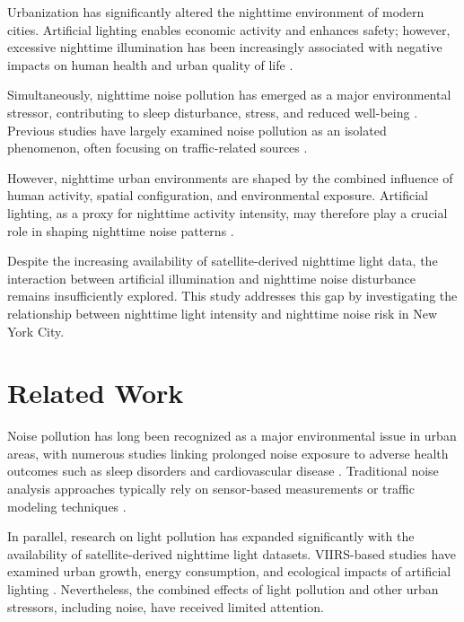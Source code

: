 \documentclass[conference]{IEEEtran}
\begin{document}
Urbanization has significantly altered the nighttime environment of modern cities.
Artificial lighting enables economic activity and enhances safety; however,
excessive nighttime illumination has been increasingly associated with negative
impacts on human health and urban quality of life \cite{falchi2016world,longcore2004ecological}.

Simultaneously, nighttime noise pollution has emerged as a major environmental
stressor, contributing to sleep disturbance, stress, and reduced well-being
\cite{basner2014auditory}.
Previous studies have largely examined noise pollution as an isolated phenomenon,
often focusing on traffic-related sources \cite{can2016traffic}.

However, nighttime urban environments are shaped by the combined influence of
human activity, spatial configuration, and environmental exposure.
Artificial lighting, as a proxy for nighttime activity intensity, may therefore
play a crucial role in shaping nighttime noise patterns \cite{kyba2017artificial}.

Despite the increasing availability of satellite-derived nighttime light data,
the interaction between artificial illumination and nighttime noise disturbance
remains insufficiently explored.
This study addresses this gap by investigating the relationship between nighttime
light intensity and nighttime noise risk in New York City.

\section{Related Work}

Noise pollution has long been recognized as a major environmental issue in urban
areas, with numerous studies linking prolonged noise exposure to adverse health
outcomes such as sleep disorders and cardiovascular disease \cite{basner2014auditory}.
Traditional noise analysis approaches typically rely on sensor-based measurements
or traffic modeling techniques \cite{can2016traffic}.

In parallel, research on light pollution has expanded significantly with the
availability of satellite-derived nighttime light datasets.
VIIRS-based studies have examined urban growth, energy consumption, and ecological
impacts of artificial lighting \cite{elvidge2017viirs,longcore2004ecological}.
Nevertheless, the combined effects of light pollution and other urban stressors,
including noise, have received limited attention.
\end{document}
